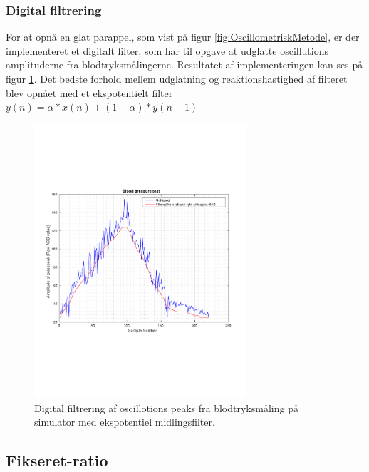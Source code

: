 \subsubsection{Digital filtrering}
For at opnå en glat parappel, som vist på  figur \ref{fig:OscillometriskMetode}, er der implementeret et digitalt filter, som har til opgave at udglatte oscillutions amplituderne fra blodtryksmålingerne. Resultatet af implementeringen kan ses på figur \ref{fig:digitalFilterData}. Det bedste forhold mellem udglatning og reaktionshastighed af filteret blev opnået med et ekspotentielt filter $y(n)=\alpha*x(n)+(1-\alpha)*y(n-1)$

\begin{figure}[H]
	\centering
	\includegraphics[trim={0 0 0 0},clip, width=0.7\textwidth]{billeder/digitalFilterData.pdf}	
	\parbox{10.5cm}{\caption{Digital filtrering af oscillotions peaks fra blodtryksmåling på simulator med ekspotentiel midlingsfilter.}\label{fig:digitalFilterData}}
\end{figure}


\subsection{Fikseret-ratio} \label{Fikseret-ratio}